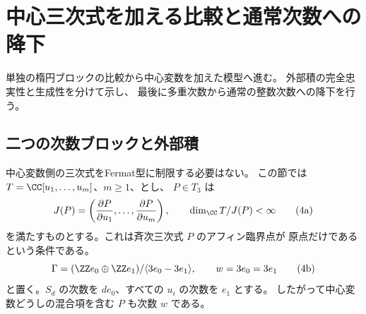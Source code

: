 \section{中心三次式を加える比較と通常次数への降下}\label{sec:TS}

単独の楕円ブロックの比較から中心変数を加えた模型へ進む。
外部積の完全忠実性と生成性を分けて示し、
最後に多重次数から通常の整数次数への降下を行う。

\subsection{二つの次数ブロックと外部積}

中心変数側の三次式をFermat型に制限する必要はない。
この節では \(T=\CC[u_1,\ldots,u_m]\)、\(m\ge1\)、とし、
\(P\in T_3\) は
\[
 J(P)=\left(\frac{\partial P}{\partial u_1},\ldots,
                 \frac{\partial P}{\partial u_m}\right),\qquad
 \dim_\CC T/J(P)<\infty                                      \tag{4a}\label{eq:central-isolated}
\]
を満たすものとする。これは斉次三次式 \(P\) のアフィン臨界点が
原点だけであるという条件である。
\[
 \Gamma=(\ZZ e_0\oplus\ZZ e_1)/\langle3e_0-3e_1\rangle,
 \qquad w=3e_0=3e_1                                       \tag{4b}\label{eq:central-gamma}
\]
と置く。\(S_d\) の次数を \(de_0\)、すべての \(u_i\) の次数を \(e_1\) とする。
したがって中心変数どうしの混合項を含む \(P\) も次数 \(w\) である。

